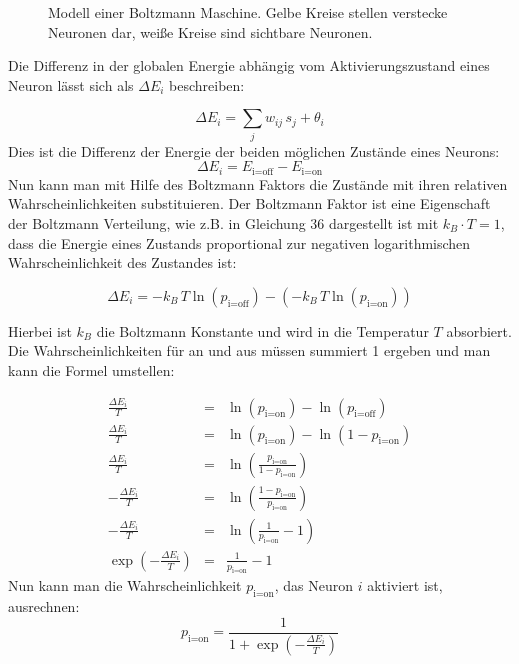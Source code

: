 \documentclass[12pt]{article}
\begin{document}
\begin{figure}[H]
	\center
	
	\caption{Modell einer Boltzmann Maschine. Gelbe Kreise stellen verstecke Neuronen dar, weiße Kreise sind sichtbare Neuronen.}
	\label{Boltzmannmaschine}
	\end{figure}
	
Die Differenz in der globalen Energie abhängig vom Aktivierungszustand eines Neuron lässt sich als  $\Delta E_i$ beschreiben:

\begin{equation}
\Delta E_i = \sum_j w_{ij} \, s_j + \theta_i
\end{equation}
 Dies ist die Differenz der Energie der beiden möglichen Zustände eines Neurons:
 \begin{equation}
 \Delta E_i = E_\text{i=off} - E_\text{i=on}
 \end{equation}
 Nun kann man mit Hilfe des Boltzmann Faktors die Zustände mit ihren relativen Wahrscheinlichkeiten substituieren. Der Boltzmann Faktor ist eine Eigenschaft der Boltzmann Verteilung, wie z.B. in Gleichung 36 dargestellt ist mit $k_B\cdot T=1$, dass die Energie eines Zustands proportional zur negativen logarithmischen Wahrscheinlichkeit des Zustandes ist:
 
 \begin{equation}
 \Delta E_i = -k_B\,T\ln(p_\text{i=off}) - (-k_B\,T\ln(p_\text{i=on}))
 \end{equation}
 
 Hierbei ist $k_B$ die Boltzmann Konstante und wird in die Temperatur $T$ absorbiert. Die Wahrscheinlichkeiten für an und aus müssen summiert 1 ergeben und man kann die Formel umstellen:
 
 \begin{eqnarray}
 \frac{\Delta E_i}{T} &=& \ln(p_\text{i=on}) - \ln(p_\text{i=off})\\\nonumber
\frac{\Delta E_i}{T} &=& \ln(p_\text{i=on}) - \ln(1 - p_\text{i=on})\\\nonumber
\frac{\Delta E_i}{T} &=& \ln\left(\frac{p_\text{i=on}}{1 - p_\text{i=on}}\right)\\\nonumber
-\frac{\Delta E_i}{T} &=& \ln\left(\frac{1 - p_\text{i=on}}{p_\text{i=on}}\right)\\\nonumber
-\frac{\Delta E_i}{T} &=& \ln\left(\frac{1}{p_\text{i=on}} - 1\right)\\\nonumber
\exp\left(-\frac{\Delta E_i}{T}\right) &=& \frac{1}{p_\text{i=on}} - 1
 \end{eqnarray}
Nun kann man die Wahrscheinlichkeit $p_\text{i=on}$, das Neuron $i$ aktiviert ist, ausrechnen:
\begin{equation}
p_\text{i=on} = \frac{1}{1+\exp(-\frac{\Delta E_i}{T})}
\end{equation}
\end{document}
